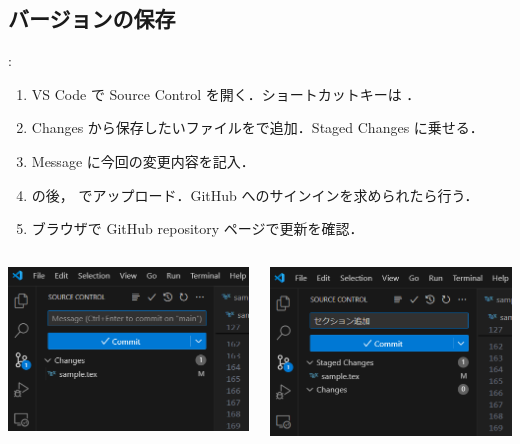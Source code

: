\documentclass[aspectratio=169,dvipdfmx,cjk]{beamer}
\begin{document}
\subsection{バージョンの保存}
\begin{frame}[label=git]{\insertsection \thesubsection: \insertsubsection}
  \begin{enumerate}
    \item VS Code で Source Control を開く．ショートカットキーは ．
    \item Changes から保存したいファイルを\beamerbutton{+}で追加．Staged Changes に乗せる．
    \item Message に今回の変更内容を記入．
    \item {} の後， でアップロード．GitHub へのサインインを求められたら行う．
    \item ブラウザで GitHub repository ページで更新を確認．
  \end{enumerate}
  \begin{columns}
    \begin{column}{0.3\textwidth}
        \includegraphics[width=1.0\linewidth]{fig/git-control.png}
    \end{column}
    \begin{column}{0.3\textwidth}
      \includegraphics[width=1.0\linewidth]{fig/git-commit.png}

\end{column}
\end{columns}
\end{frame}
\end{document}
